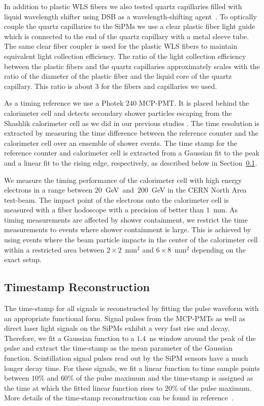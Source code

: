In addition to plastic WLS fibers we also tested quartz capillaries filled with
liquid wavelength shifter using DSB as a wavelength-shifting
agent~\cite{Baumbaugh:2016vcg}. To optically couple the quartz capillaries to the
SiPMs we use a clear plastic fiber light guide which is connected to the end of
the quartz capillary with a metal sleeve tube. The same clear fiber coupler is
used for the plastic WLS fibers to maintain equivalent light collection
efficiency. The ratio of the light collection efficiency between the plastic
fibers and the quartz capillaries approximately scales with the ratio of the
diameter of the plastic fiber and the liquid core of the quartz capillary. This
ratio is about $3$ for the fibers and capillaries we used.

As a timing reference we use a Photek 240 MCP-PMT. It is placed behind the
calorimeter cell and detects secondary shower particles escaping from the
Shashlik calorimeter cell as we did in our previous studies \cite{Anderson:2015gha}.
The time resolution is extracted by measuring the time difference between the
reference counter and the calorimeter cell over an ensemble of shower events.
The time stamp for the reference counter and calorimeter cell is extracted
from a Gaussian fit to the peak and a linear fit to the rising edge, 
respectively, as described below in Section~\ref{sec:reco}.

We measure the timing performance of the calorimeter cell with high energy
electrons in a range between $20$~GeV~and~$200$~GeV in the CERN North Area
test-beam. The impact point of the electrons onto the calorimeter cell is
measured with a fiber hodoscope with a precision of better than $1$~mm. As
timing measurements are affected by shower containment, we restrict the time
measurements to events where shower containment is large. This is achieved by
using events where the beam particle impacts in the center of
the calorimeter cell within a restricted area between
$2\times2$~$\mathrm{mm}^{2}$ and $6\times8$~$\mathrm{mm}^{2}$ depending on the
exact setup. 

\subsection{Timestamp Reconstruction} \label{sec:reco} The time-stamp for all
signals is reconstructed by fitting the pulse waveform with an appropriate
functional form. Signal pulses from the MCP-PMTs as well as direct laser light
signals on the SiPMs exhibit a very fast rise and decay. Therefore, we fit a
Gaussian function to a $1.4$~ns window around the peak of the pulse and extract
the time-stamp as the mean parameter of the Gaussian function. Scintillation
signal pulses read out by the SiPM sensors have a much longer decay time. For
these signals, we fit a linear function to time sample points between $10\%$ and
$60\%$ of the pulse maximum and the time-stamp is assigned as the time at which
the fitted linear function rises to $20\%$ of the pulse maximum. More details of
the time-stamp reconstruction can be found in reference~\cite{Anderson:2015gha}.
